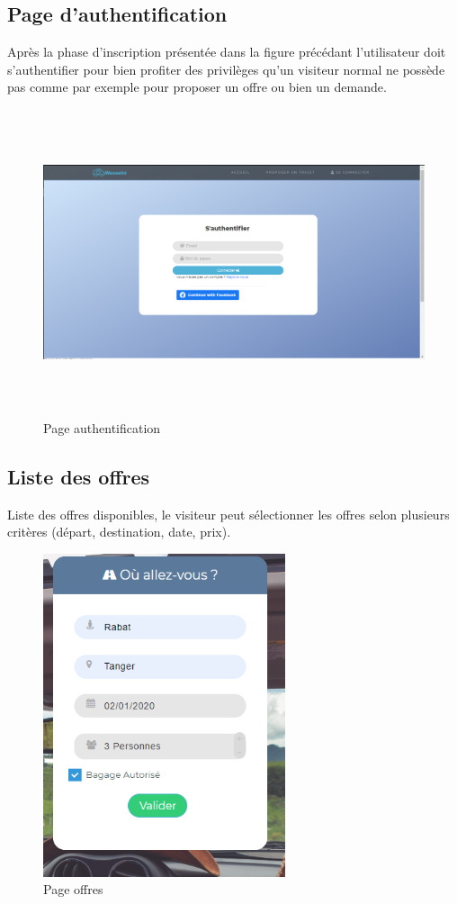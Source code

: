 \documentclass[a4paper]{report}
\begin{document}
\begin{spacing}{2}
\subsection{Page d'authentification}
Après la phase d’inscription présentée dans la figure précédant l'utilisateur  doit s’authentifier pour bien profiter des privilèges qu’un visiteur normal ne possède pas comme par exemple pour proposer un offre ou bien un demande.\\ 
\begin{figure}[!ht]
\begin{center}
\includegraphics[height=9cm]{auth.png}
\end{center}
\caption[Page authentification]{Page authentification}
\end{figure}

\subsection{Liste des offres}
Liste des offres disponibles, le visiteur peut sélectionner les offres selon plusieurs critères (départ, destination, date, prix).\\ 
\begin{figure}[!ht]
\begin{center}
\includegraphics[height=9.5cm]{offre1.png}
\end{center}
\caption[Page offres]{Page offres}
\end{figure}


\end{spacing}
\end{document}

